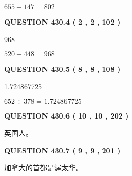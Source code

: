 \documentclass{ctexart}
\begin{document}
$ %
655 +  %
147=   %
802$
 
 
  
\vspace{0.2in}
  
{\textbf{\Large{QUESTION
430.4 
 ( 2 , 2 , 102 )
}}}
  
  
 
 
\noindent{}

968
 
 
 
 
\noindent{}

$ %
520 +  %
448=   %
968$
 
 
  
\vspace{0.2in}
  
{\textbf{\Large{QUESTION
430.5 
 ( 8 , 8 , 108 )
}}}
  
  
 
 
\noindent{}

1.724867725
 
 
 
 
\noindent{}

$ %
652 \div  %
378=   %
1.724867725$
 
 
  
\vspace{0.2in}
  
{\textbf{\Large{QUESTION
430.6 
 ( 10 , 10 , 202 )
}}}
  
  
 
 
\noindent{}
 
 
英国人。
 
 
 
 
  
\vspace{0.2in}
  
{\textbf{\Large{QUESTION
430.7 
 ( 9 , 9 , 201 )
}}}
  
  
 
 
\noindent{}
 
 
加拿大的首都是渥太华。
 
\end{document}
